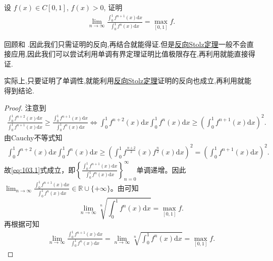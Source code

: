 \documentclass[../../main.tex]{subfiles}
\begin{document}
\begin{example}
设 $f(x) \in C[0,1]$, $f(x) > 0$, 证明
\begin{align*}
\lim_{n \to \infty} \frac{\int_0^1 f^{n+1}(x) \mathrm{d}x}{\int_0^1 f^n(x) \mathrm{d}x} = \max_{[0,1]} f.
\end{align*}
\end{example}
\begin{note}
回顾和
.因此我们只需证明的反向,再结合就能得证.但是\hyperref[theorem:反向Stolz定理]{反向Stolz定理}一般不会直接应用,因此我们可以尝试利用单调有界定理证明比值极限存在,再利用就能直接得证.

实际上,只要证明了单调性,就能利用\hyperref[theorem:反向Stolz定理]{反向Stolz定理}证明的反向也成立,再利用就能得到结论.
\end{note}
\begin{proof}
注意到
\begin{align}
\frac{\int_0^1 f^{n+2}(x) \mathrm{d}x}{\int_0^1 f^{n+1}(x) \mathrm{d}x} \geqslant \frac{\int_0^1 f^{n+1}(x) \mathrm{d}x}{\int_0^1 f^n(x) \mathrm{d}x} \Longleftrightarrow \int_0^1 f^{n+2}(x) \mathrm{d}x \int_0^1 f^n(x) \mathrm{d}x \geqslant \left( \int_0^1 f^{n+1}(x) \mathrm{d}x \right)^2.\label{eq:103.1}
\end{align}
由Cauchy不等式知
\begin{align*}
\int_0^1 f^{n+2}(x) \mathrm{d}x \int_0^1 f^n(x) \mathrm{d}x \geqslant \left( \int_0^1 f^{\frac{n+2}{2}}(x) f^{\frac{n}{2}}(x) \mathrm{d}x \right)^2 = \left( \int_0^1 f^{n+1}(x) \mathrm{d}x \right)^2.
\end{align*}
故\eqref{eq:103.1}式成立，即$\left\{ \frac{\int_0^1 f^{n+1}(x) \mathrm{d}x}{\int_0^1 f^n(x) \mathrm{d}x} \right\}_{n=0}^{\infty}$单调递增。因此$\lim_{n \to \infty} \frac{\int_0^1 f^{n+1}(x) \mathrm{d}x}{\int_0^1 f^n(x) \mathrm{d}x} \in \mathbb{R} \cup \{ +\infty \}$。由可知$$\lim_{n \to \infty} \sqrt[n]{\int_0^1 f^n(x) \mathrm{d}x} = \max_{[0,1]} f.$$再根据可知
\begin{align*}
\lim_{n \to \infty} \frac{\int_0^1 f^{n+1}(x) \mathrm{d}x}{\int_0^1 f^n(x) \mathrm{d}x} = \lim_{n \to \infty} \sqrt[n]{\int_0^1 f^n(x) \mathrm{d}x} = \max_{[0,1]} f.
\end{align*}
\end{proof}
\end{document}

